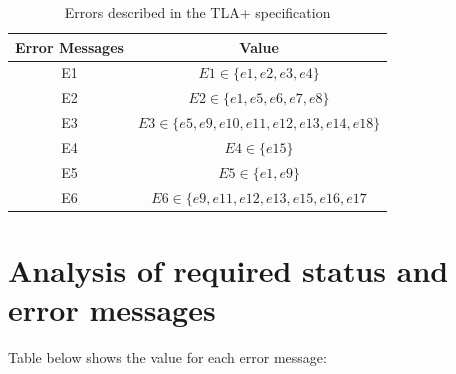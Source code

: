 \begin{table}[h]
\centering
\begin{tabular}{| c | c | }
	\cline{1-2}
	\textbf{Error Messages} & \textbf{Value} \\ \hline
	E1 & $E1 \in \{e1, e2, e3, e4\}$ \\ \hline
	E2 & $E2 \in \{e1, e5, e6, e7, e8\}$ \\ \hline
	E3 & $E3 \in \{e5, e9, e10, e11, e12, e13, e14, e18\}$ \\ \hline
	E4 & $E4 \in \{e15\}$ \\ \hline
	E5 & $E5 \in \{e1, e9\}$ \\ \hline
    E6 & $E6 \in \{e9, e11, e12, e13, e15, e16, e17$ \\ \hline
\end{tabular}
\caption {Errors described in the TLA+ specification}
\label{tbl:error_spec}
\end{table}


\newpage
\section{Analysis of required status and error messages}
Table below shows the value for each error message:

\bigskip

